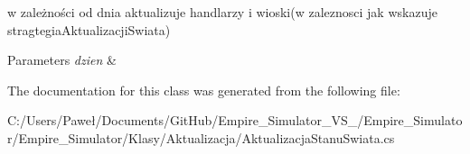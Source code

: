 w zależności od dnia aktualizuje handlarzy i wioski(w zaleznosci jak wskazuje stragtegia\+Aktualizacji\+Swiata) 


\begin{DoxyParams}{Parameters}
{\em dzien} & \\
\hline
\end{DoxyParams}


The documentation for this class was generated from the following file\+:\begin{DoxyCompactItemize}
\item 
C\+:/\+Users/\+Paweł/\+Documents/\+Git\+Hub/\+Empire\+\_\+\+Simulator\+\_\+\+V\+S\+\_/\+Empire\+\_\+\+Simulator/\+Empire\+\_\+\+Simulator/\+Klasy/\+Aktualizacja/Aktualizacja\+Stanu\+Swiata.\+cs\end{DoxyCompactItemize}
